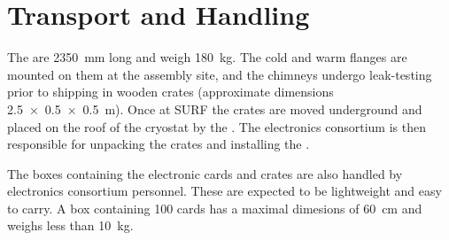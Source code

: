\section{Transport and Handling}
\label{sec:dp-tpcelec-transport}

The  are \SI{2350}{\mm} long and weigh \SI{180}{\kg}.  The cold and warm flanges are mounted on them at the assembly site, and the chimneys undergo leak-testing prior to shipping in wooden crates (approximate dimensions \SI[product-units=power]{2.5x0.5x0.5}{m}). Once at SURF the crates are moved underground and placed on the roof of the cryostat by the . The \dual electronics consortium is then responsible for unpacking the crates and installing the . 

The boxes containing the electronic cards and  crates are also handled by \dual electronics consortium personnel. These are expected to be lightweight and %
easy to carry. A box containing \num{100}  cards has a maximal dimesions of \SI{60}{\cm} and weighs less than \SI{10}{\kg}. 


